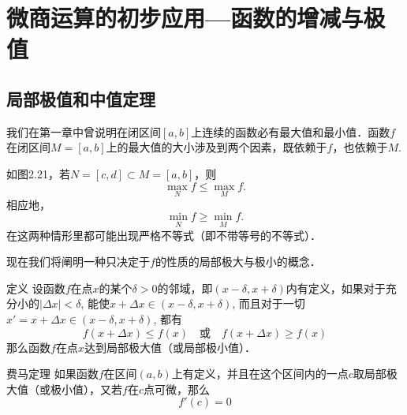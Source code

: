 \section{微商运算的初步应用{}---{}函数的增减与极值}

\subsection{局部极值和中值定理}
我们在第一章中曾说明在闭区间$[a,b]$上连续的函数必有最大值和最小值．函数$f$在闭区间$M=[a,b]$上的最大值的大小涉及到两个因素，既依赖于$f$，也依赖于$M$.

如图2.21，若$N=[c,d]\subset M=[a,b]$，则
\[
\max_N f \le \max_M f.
\]
相应地，
\[
\min_N f \ge \min_M f.
\]
在这两种情形里都可能出现严格不等式（即不带等号的不等式）．

\begin{figure}[htp]
    \centering
    \caption{}
\end{figure}

现在我们将阐明一种只决定于$f$的性质的局部极大与极小的概念．

\begin{blk}
    {定义} 设函数$f$在点$x$的某个$\delta>0$的邻域，即$(x-\delta,x+\delta)$内有定义，如果对于充分小的$|\Delta x|<\delta$, 能使$x+\Delta x\in (x-\delta,x+\delta)$, 而且对于一切$x'=x+\Delta x\in (x-\delta,x+\delta)$, 都有
\[f(x+\Delta x)\le f(x)\quad \text{或}\quad f(x+\Delta x)\ge f(x)\]
那么函数$f$在点$x$达到局部极大值（或局部极小值）．
\end{blk}

\begin{blk}
    {费马定理} 如果函数$f$在区间$(a,b)$上有定义，并且在这个区间内的一点$c$取局部极大值（或极小值），又若$f$在$c$点可微，那么
    \[f' (c) =0\]
\end{blk}

